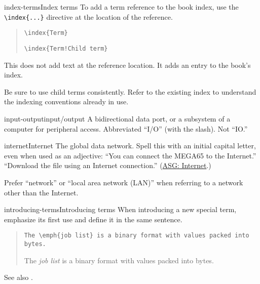 \begin{sgentry}{index-terms}{Index terms}
    To add a term reference to the book index, use the \texttt{{\textbackslash}index\{...\}} directive at the location of the reference.

    \begin{quote}
        \texttt{{\textbackslash}index\{Term\}}

        \hrulefill

        \texttt{{\textbackslash}index\{Term!Child term\}}
    \end{quote}

    This does not add text at the reference location. It adds an entry to the book's index.

    Be sure to use child terms consistently. Refer to the existing index to understand the indexing conventions already in use.
\end{sgentry}

\begin{sgentry}{input-output}{input/output}
    A bidirectional data port, or a subsystem of a computer for peripheral access. Abbreviated ``I/O'' (with the slash). Not ``IO.''
\end{sgentry}

\begin{sgentry}{internet}{Internet}
    The global data network. Spell this with an initial capital letter, even when used as an adjective: ``You can connect the MEGA65 to the Internet.'' ``Download the file using an Internet connection.'' (\href{https://support.apple.com/en-my/guide/applestyleguide/apsg346ef241/web}{ASG: Internet}.)

    Prefer ``network'' or ``local area network (LAN)'' when referring to a network other than the Internet.
\end{sgentry}

\begin{sgentry}{introducing-terms}{Introducing terms}
    When introducing a new special term, emphasize its first use and define it in the same sentence.

    \begin{quote}
        \texttt{The {\textbackslash}emph\{job list\} is a binary format with values packed into bytes.}

        \hrulefill

        The \emph{job list} is a binary format with values packed into bytes.
    \end{quote}

    See also .
\end{sgentry}

